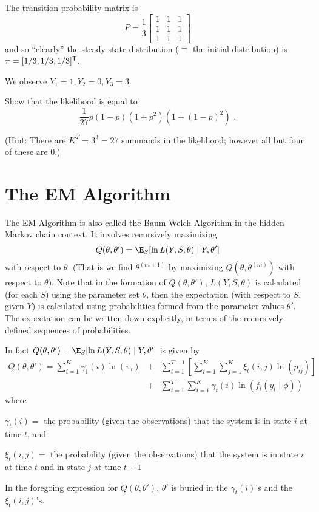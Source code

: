 The transition probability matrix is
\[
P = \frac{1}{3} \left[ \begin{array}{ccc}
			1 & 1 & 1 \\
			1 & 1 & 1 \\
			1 & 1 & 1 \end{array} \right]
\]
and so ``clearly'' the steady state distribution ($\equiv$ the initial
distribution) is $\pi = [1/3, 1/3, 1/3]^{\mbox{\scriptsize \sf T}}$.

We observe $Y_1 = 1, Y_2 = 0, Y_3 = 3$.

 Show that the likelihood is equal to
\[
\frac{1}{27} p(1-p)(1+p^2)(1 + (1-p)^2) \mbox{ .}
\]

(Hint:  There are $K^T = 3^3 = 27$ summands in the likelihood; however
all but four of these are 0.)

\section{The EM Algorithm}

The EM Algorithm is also called the Baum-Welch Algorithm in the
hidden Markov chain context.  It involves recursively maximizing
\[
Q(\theta, \theta') = \E_S [ \ln L(Y,S,\theta) \; | \; Y, \theta']
\]
with respect to $\theta$.  (That is we find $\theta^{(m+1)}$ by
maximizing $Q(\theta,\theta^{(m)})$ with respect to $\theta$).  Note
that in the formation of $Q(\theta, \theta')$, $L(Y,S,\theta)$ is
calculated (for each $S$) using the parameter set $\theta$, then the
expectation (with respect to $S$, given $Y$) is calculated using
probabilities formed from the parameter values $\theta'$.  The
expectation can be written down explicitly, in terms of the
recursively defined sequences of probabilities.

In fact $Q(\theta, \theta') = \E_S [ \ln L(Y,S,\theta) \; | \; Y, \theta']$
is given by
\begin{eqnarray*}
Q(\theta, \theta') = \sum_{i=1}^K \gamma_1(i) \ln(\pi_i) & + &
\sum_{t=1}^{T-1} \left[ \sum_{i=1}^K \sum_{j=1}^K \xi_t(i,j)
   \ln(p_{ij}) \right] \\
   & + & \sum_{t=1}^T \sum_{i=1}^K \gamma_t(i)
         \ln(f_i(y_t\;|\; \phi))
\end{eqnarray*}
where
\begin{list}{}{}
\item $\gamma_t(i) =$ the probability (given the observations) that
the system is in state $i$ at time $t$, and
\item $\xi_t(i,j) =$ the probability (given the observations) that
the system is in state $i$ at time $t$ and in state $j$ at time $t+1$
\end{list}
In the foregoing expression for $Q(\theta, \theta')$, $\theta'$
is buried in the $\gamma_t(i)$'s and the $\xi_t(i,j)$'s.

